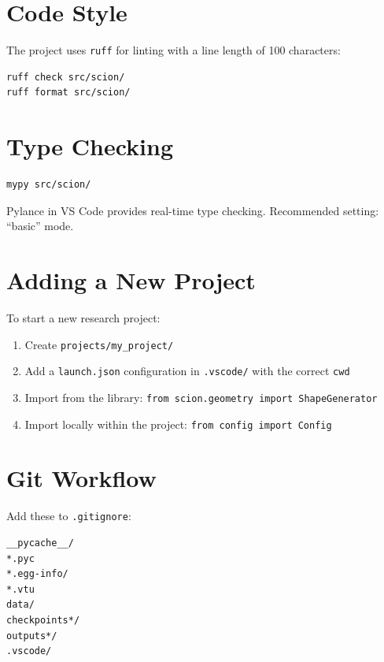 \documentclass[11pt,a4paper]{report}
\begin{document}
\section{Code Style}

The project uses \texttt{ruff} for linting with a line length of 100 characters:

\begin{lstlisting}[style=bash]
ruff check src/scion/
ruff format src/scion/
\end{lstlisting}

\section{Type Checking}

\begin{lstlisting}[style=bash]
mypy src/scion/
\end{lstlisting}

Pylance in VS Code provides real-time type checking. Recommended setting: ``basic'' mode.

\section{Adding a New Project}

To start a new research project:

\begin{enumerate}[leftmargin=2em]
    \item Create \texttt{projects/my\_project/}
    \item Add a \texttt{launch.json} configuration in \texttt{.vscode/} with the correct \texttt{cwd}
    \item Import from the library: \texttt{from scion.geometry import ShapeGenerator}
    \item Import locally within the project: \texttt{from config import Config}
\end{enumerate}

\section{Git Workflow}

Add these to \texttt{.gitignore}:

\begin{lstlisting}[style=bash,numbers=none]
__pycache__/
*.pyc
*.egg-info/
*.vtu
data/
checkpoints*/
outputs*/
.vscode/
\end{lstlisting}
\end{document}
